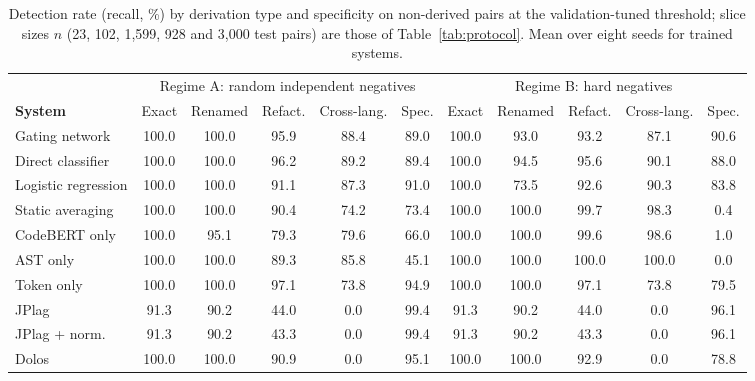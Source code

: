 \begin{table}[t]
\centering
\caption{Detection rate (recall, \%) by derivation type and specificity on non-derived pairs at the validation-tuned threshold; slice sizes $n$ (23, 102, 1{,}599, 928 and 3{,}000 test pairs) are those of Table~\ref{tab:protocol}. Mean over eight seeds for trained systems.}
\label{tab:clone-f1}
\scriptsize
\setlength{\tabcolsep}{3.5pt}
\begin{tabular}{l|ccccc|ccccc}
\toprule
 & \multicolumn{5}{c|}{Regime A: random independent negatives} & \multicolumn{5}{c}{Regime B: hard negatives} \\
\textbf{System} & Exact & Renamed & Refact. & Cross-lang. & Spec. & Exact & Renamed & Refact. & Cross-lang. & Spec. \\
\midrule
Gating network & 100.0 & 100.0 & 95.9 & 88.4 & 89.0 & 100.0 & 93.0 & 93.2 & 87.1 & 90.6 \\
Direct classifier & 100.0 & 100.0 & 96.2 & 89.2 & 89.4 & 100.0 & 94.5 & 95.6 & 90.1 & 88.0 \\
Logistic regression & 100.0 & 100.0 & 91.1 & 87.3 & 91.0 & 100.0 & 73.5 & 92.6 & 90.3 & 83.8 \\
Static averaging & 100.0 & 100.0 & 90.4 & 74.2 & 73.4 & 100.0 & 100.0 & 99.7 & 98.3 & 0.4 \\
CodeBERT only & 100.0 & 95.1 & 79.3 & 79.6 & 66.0 & 100.0 & 100.0 & 99.6 & 98.6 & 1.0 \\
AST only & 100.0 & 100.0 & 89.3 & 85.8 & 45.1 & 100.0 & 100.0 & 100.0 & 100.0 & 0.0 \\
Token only & 100.0 & 100.0 & 97.1 & 73.8 & 94.9 & 100.0 & 100.0 & 97.1 & 73.8 & 79.5 \\
JPlag & 91.3 & 90.2 & 44.0 & 0.0 & 99.4 & 91.3 & 90.2 & 44.0 & 0.0 & 96.1 \\
JPlag + norm. & 91.3 & 90.2 & 43.3 & 0.0 & 99.4 & 91.3 & 90.2 & 43.3 & 0.0 & 96.1 \\
Dolos & 100.0 & 100.0 & 90.9 & 0.0 & 95.1 & 100.0 & 100.0 & 92.9 & 0.0 & 78.8 \\
\bottomrule
\end{tabular}
\end{table}